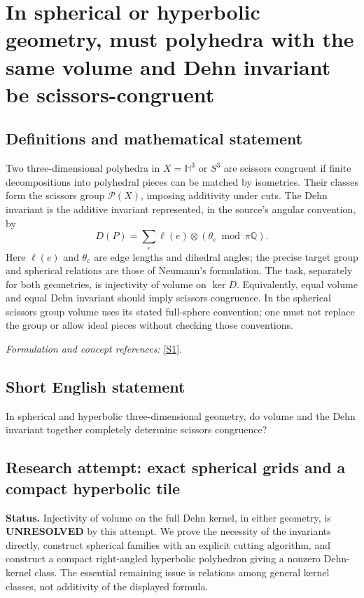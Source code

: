 \documentclass[11pt]{article}
\begin{document}
\section*{\texorpdfstring{In spherical or hyperbolic geometry, must polyhedra with the same volume and Dehn invariant be scissors-congruent}{In spherical or hyperbolic geometry, must polyhedra with the same volume and Dehn invariant be scissors-congruent}}\label{7200010}
\subsection{Definitions and mathematical statement}
Two three-dimensional polyhedra in $X=\mathbb H^3$ or $S^3$ are scissors congruent if finite decompositions into polyhedral pieces can be matched by isometries. Their classes form the scissors group $\mathcal P(X)$, imposing additivity under cuts. The Dehn invariant is the additive invariant represented, in the source's angular convention, by
\[
 D(P)=\sum_{e}\ell(e)\otimes(\theta_e\bmod\pi{\mathbb{Q}}).
\]
Here $\ell(e)$ and $\theta_e$ are edge lengths and dihedral angles; the precise target group and spherical relations are those of Neumann's formulation. The task, separately for both geometries, is injectivity of volume on $\ker D$. Equivalently, equal volume and equal Dehn invariant should imply scissors congruence. In the spherical scissors group volume uses its stated full-sphere convention; one must not replace the group or allow ideal pieces without checking those conventions.
\par\smallskip\textit{Formulation and concept references:} \href{https://arxiv.org/pdf/math/9712226}{[S1]}.

\subsection{Short English statement}
In spherical and hyperbolic three-dimensional geometry, do volume and the Dehn invariant together completely determine scissors congruence?
\subsection{Research attempt: exact spherical grids and a compact hyperbolic tile}
\textbf{Status.} Injectivity of volume on the full Dehn kernel, in either geometry, is \textbf{UNRESOLVED} by this attempt. We prove the necessity of the invariants directly, construct spherical families with an explicit cutting algorithm, and construct a compact right-angled hyperbolic polyhedron giving a nonzero Dehn-kernel class. The essential remaining issue is relations among general kernel classes, not additivity of the displayed formula.
\end{document}
